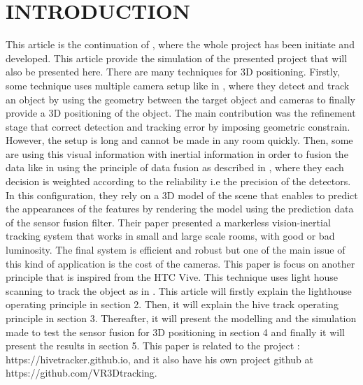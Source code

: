 \documentclass{vldb}
\begin{document}
\section{INTRODUCTION}
This article is the continuation of \cite{cedric}, where the whole project has been initiate and developed. This article provide the simulation of the presented project that will also be presented here. \newline
There are many techniques for 3D positioning. Firstly, some technique uses multiple camera setup like in \cite{lee2013real}, where they detect and track an object by using the geometry between the target object and cameras to finally provide a 3D positioning of the object. The main contribution was the refinement stage that correct detection and tracking error by imposing geometric constrain. However, the setup is long and cannot be made in any room quickly. \newline
Then, some are using this visual information with inertial information in order to fusion the data like in \cite{bleser2009advanced} using the principle of data fusion as described in \cite{chair1986optimal}, where they each decision is weighted according to the reliability i.e the precision of the detectors. In this configuration, they rely on a 3D model of the scene that enables to predict the appearances of the features by rendering the model using the prediction data of the
sensor fusion filter. Their paper presented a markerless vision-inertial tracking system that works in small and large scale rooms, with good or bad luminosity. The final system is efficient and robust but one of the main issue of this kind of application is the cost of the cameras.\newline
This paper is focus on another principle that is inspired from the HTC Vive. This technique uses light house scanning to track the object as in \cite{kreylos2016lighthouse}. This article will firstly explain the lighthouse operating principle in section 2. Then, it will explain the hive track operating principle in section 3. Thereafter, it will present the modelling and the simulation made to test the sensor fusion for 3D positioning in section 4 and finally it will present the results in section 5. This paper is related to the project : https://hivetracker.github.io, and it also have his own project github at \newline https://github.com/VR3Dtracking.
\end{document}
